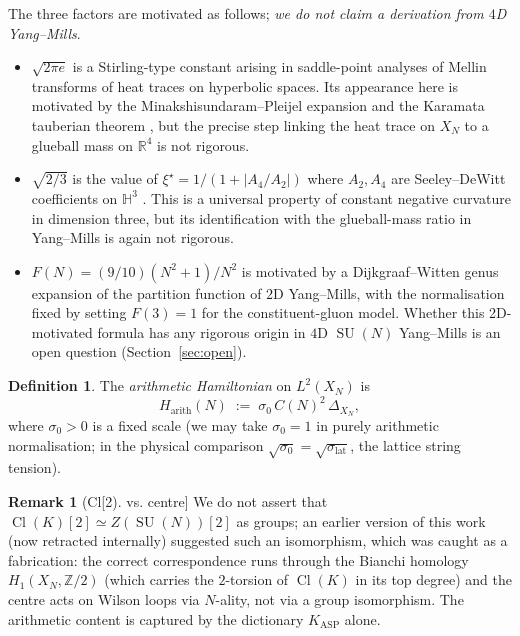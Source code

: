 \documentclass[11pt,a4paper]{article}
\theoremstyle{definition}
\newtheorem{definition}[theorem]{Definition}
\newtheorem{remark}[theorem]{Remark}
\DeclareMathOperator{\Cl}{Cl}
\DeclareMathOperator{\SU}{SU}
\newcommand{\KASP}{K_{\mathrm{ASP}}}
\newcommand{\Harith}{H_{\mathrm{arith}}}
\newcommand{\HH}{\mathbb{H}}
\newcommand{\ZZ}{\mathbb{Z}}
\newcommand{\RR}{\mathbb{R}}
\begin{document}
The three factors are motivated as follows; \emph{we do not claim a
derivation from $4$D Yang--Mills}.
\begin{itemize}[noitemsep]
\item $\sqrt{2\pi e}$ is a Stirling-type constant arising in saddle-point
analyses of Mellin transforms of heat traces on hyperbolic spaces. Its
appearance here is motivated by the Minakshisundaram--Pleijel expansion
\cite[\S 4]{Vassilevich2003} and the Karamata tauberian theorem
\cite{Karamata1930,Gangolli1968}, but the precise step linking the
heat trace on $X_N$ to a glueball mass on $\RR^4$ is not rigorous.
\item $\sqrt{2/3}$ is the value of $\xi^\star = 1/(1+|A_4/A_2|)$ where
$A_2, A_4$ are Seeley--DeWitt coefficients on $\HH^3$
\cite{Gilkey1995,Vassilevich2003}. This is a universal property of constant
negative curvature in dimension three, but its identification with the
glueball-mass ratio in Yang--Mills is again not rigorous.
\item $F(N) = (9/10)(N^2+1)/N^2$ is motivated by a Dijkgraaf--Witten genus
expansion of the partition function of $2$D Yang--Mills, with the
normalisation fixed by setting $F(3)=1$ for the constituent-gluon model.
Whether this 2D-motivated formula has any rigorous origin in $4$D
$\SU(N)$ Yang--Mills is an open question (Section~\ref{sec:open}).
\end{itemize}

\begin{definition}\label{def:Harith}
The \emph{arithmetic Hamiltonian} on $L^2(X_N)$ is
\[
  \Harith(N) \;:=\; \sigma_0\,C(N)^2\,\Delta_{X_N},
\]
where $\sigma_0 > 0$ is a fixed scale (we may take $\sigma_0 = 1$ in
purely arithmetic normalisation; in the physical comparison
$\sqrt{\sigma_0} = \sqrt{\sigma_{\mathrm{lat}}}$, the lattice string
tension).
\end{definition}

\begin{remark}[Cl[2] vs. centre]
We do not assert that $\Cl(K)[2] \simeq Z(\SU(N))[2]$ as groups; an earlier
version of this work (now retracted internally) suggested such an isomorphism,
which was caught as a fabrication: the correct correspondence runs through
the Bianchi homology $H_1(X_N, \ZZ/2)$ (which carries the $2$-torsion of
$\Cl(K)$ in its top degree) and the centre acts on Wilson loops via
$N$-ality, not via a group isomorphism. The arithmetic content is captured
by the dictionary $\KASP$ alone.
\end{remark}
\end{document}
